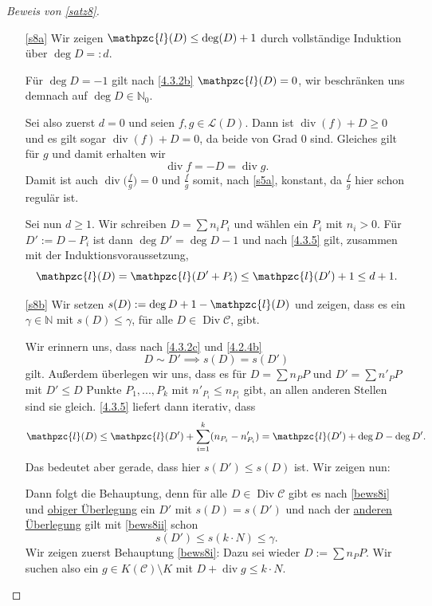 \documentclass[a4paper,12pt,index=toc]{scrbook}
\theoremstyle{keinenummern} %
\def\CC{\mathcal{C}}
\renewcommand{\L}{\mathcal{L}}
\def\ll{\mathpzc{l}}
\newcommand{\Div}{\operatorname{Div}}
\renewcommand{\div}{\operatorname{div}}
\renewcommand{\dotsc}{\ensuremath{\!...}}
\newcommand{\set}[1]{\ensuremath{\mathbb{#1}}}
\newcommand{\N}{\set{N}}
\begin{document}
\begin{proof}[Beweis von \cref{satz8}]
\begin{enumerate}
\item[\ref{s8a}] Wir zeigen $\ll(D)\leq \deg(D)+1$ durch vollständige Induktion über $\deg D=:d$.

Für $\deg D=-1$ gilt nach \cref{4.3.2b} $\ll(D)=0$, wir beschränken uns demnach auf $\deg D\in\N_{0}$.

Sei also zuerst $d=0$ und seien $f,g\in\L(D)$. Dann ist $\div(f)+D\geq 0$ und es gilt sogar $\div(f)+D=0$, da beide von Grad $0$ sind. Gleiches gilt für $g$ und damit erhalten wir
\[\div f=-D=\div g.\]
Damit ist auch $\div\bigl(\frac{f}{g}\bigr)=0$ und $\frac{f}{g}$ somit, nach \cref{s5a}, konstant, da $\frac{f}{g}$ hier schon regulär ist.

Sei nun $d\geq 1$. Wir schreiben $D=\sum n_{i}P_{i}$ und wählen ein $P_{i}$ mit $n_{i}>0$. Für $D':=D-P_{i}$ ist dann $\deg D'=\deg D-1$ und nach \cref{4.3.5} gilt, zusammen mit der Induktionsvoraussetzung,
\[\ll(D)=\ll(D'+P_{i})\leq\ll(D')+1\leq d+1.\]
\item[\ref{s8b}] Wir setzen $s(D):=\deg D+1-\ll(D)$ und zeigen, dass es ein $\gamma\in\N$ mit $s(D)\leq\gamma$, für alle $D\in\Div\CC$, gibt.

Wir erinnern uns, dass nach \cref{4.3.2c} und \cref{4.2.4b}
\hypertarget{bews8e1}{\[D\sim D'\implies s(D)=s(D')\]}
gilt. Außerdem überlegen wir uns, dass es für $D=\sum n_{P}P$ und $D'=\sum n'_{P}P$ mit $D'\leq D$ Punkte $P_{1},\dotsc,P_{k}$ mit $n'_{P_{i}}\leq n_{P_{i}}$ gibt, an allen anderen Stellen sind sie gleich. \cref{4.3.5} liefert dann iterativ, dass 
\hypertarget{bews8e3}{\[\ll(D)\leq\ll(D')+\sum_{i=1}^{k}(n_{P_{i}}-n'_{P_{i}})=\ll(D')+\deg D-\deg D'.\]}
Das bedeutet aber gerade, dass \hypertarget{bews8e2}{hier $s(D')\leq s(D)$ ist.} Wir zeigen nun:
Dann folgt die Behauptung, denn für alle $D\in\Div\CC$ gibt es nach \ref{bews8i} und \hyperlink{bews8e1}{obiger Überlegung} ein $D'$ mit $s(D)=s(D')$ und nach der \hyperlink{bews8e2}{anderen Überlegung} gilt mit \ref{bews8ii} schon
\[s(D')\leq s(k\cdot N)\leq\gamma.\]
Wir zeigen zuerst Behauptung \ref{bews8i}: Dazu sei wieder $D:=\sum n_{P}P$. Wir suchen also ein $g\in K(\CC)\setminus K$ mit $D+\div g\leq k\cdot N$.


\end{enumerate}
\end{proof}
\end{document}
